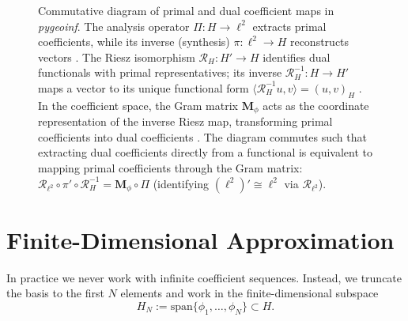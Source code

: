 \documentclass[11pt,twoside,openright]{book}
\theoremstyle{plain}
\theoremstyle{definition}
\theoremstyle{remark}
\newcommand{\Riesz}{\mathcal{R}}
\begin{document}
\begin{figure}[t]
\centering
{}
\caption{Commutative diagram of primal and dual coefficient maps in \textit{pygeoinf}.
The analysis operator $\Pi: H \to \ell^2$ extracts primal coefficients, while its inverse (synthesis) $\pi: \ell^2 \to H$ reconstructs vectors .
The Riesz isomorphism $\mathcal{R}_H: H' \to H$ identifies dual functionals with primal representatives; its inverse $\mathcal{R}_H^{-1}: H \to H'$ maps a vector to its unique functional form $\langle \mathcal{R}_H^{-1} u, v \rangle = (u, v)_H$ .
In the coefficient space, the Gram matrix $\mathbf{M}_{\phi}$ acts as the coordinate representation of the inverse Riesz map, transforming primal coefficients into dual coefficients .
The diagram commutes such that extracting dual coefficients directly from a functional is equivalent to mapping primal coefficients through the Gram matrix: $\Riesz_{\ell^2} \circ \pi' \circ \mathcal{R}_H^{-1} = \mathbf{M}_{\phi} \circ \Pi$ (identifying $(\ell^2)' \cong \ell^2$ via $\Riesz_{\ell^2}$).}
\label{fig:primal-dual-coeff}
\end{figure}

\section{Finite-Dimensional Approximation}

In practice we never work with infinite coefficient sequences.
Instead, we truncate the basis to the first $N$ elements and work in the
finite-dimensional subspace
\begin{equation}
H_N := \mathrm{span}\{\phi_1,\dots,\phi_N\} \subset H.
\end{equation}
\end{document}
